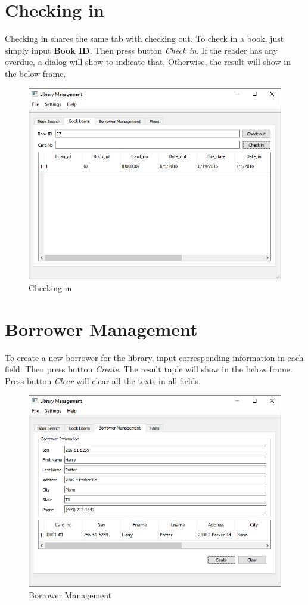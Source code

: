 \documentclass[a4paper, 12pt]{report}
\begin{document}
\section*{Checking in}
Checking in shares the same tab with checking out. To check in a book, just simply input \textbf{Book ID}. Then press button \textit{Check in}. If the reader has any overdue, a dialog will show to indicate that. Otherwise, the result will show in the below frame.
\begin{figure}[H]
  \includegraphics[width=\textwidth, inner]{./screenshot/checking_in.png}
  \caption{Checking in}
\end{figure}

\pagebreak

\section*{Borrower Management}
To create a new borrower for the library, input corresponding information in each field. Then press button \textit{Create}. The result tuple will show in the below frame. Press button \textit{Clear} will clear all the texts in all fields.
\begin{figure}[H]
  \includegraphics[width=\textwidth, inner]{./screenshot/borrower.png}
  \caption{Borrower Management}
\end{figure}
\end{document}
